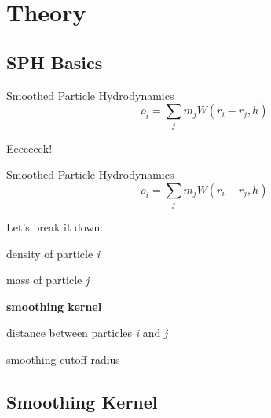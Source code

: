 \documentclass[12pt]{beamer}
\begin{document}
\section{Theory}

\begin{frame}
\end{frame}


\subsection{SPH Basics}

\begin{frame}{Smoothed Particle Hydrodynamics}
\[
\rho_i=\sum_j m_j W(r_i-r_j,h)
\]
\pause

\begin{center}
\alert{Eeeeeeek!}
\end{center}

\end{frame}


\begin{frame}[t]{Smoothed Particle Hydrodynamics}
\[
\rho_i=\sum_j m_j W(r_i-r_j,h)
\]
\begin{block}{Let's break it down:} 
\pause

\begin{description}[<+->]
\item[$\rho_i$] density of particle \textit{i}  
\item[$m_j$] mass of particle \textit{j}
\item[$W$] \textbf{smoothing kernel}
\item[$r_i-r_j$] distance between particles \textit{i} and \textit{j}
\item[$h$] smoothing cutoff radius
\end{description}

\end{block}

\end{frame}


\subsection{Smoothing Kernel}
\end{document}
